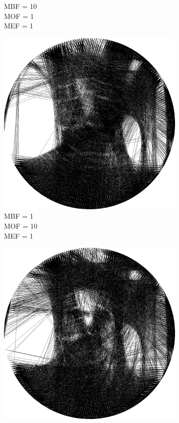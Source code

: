 \begin{figure}[htb]
\begin{subfigure}{0.24\textwidth}
        \caption{MBF = 10 \\ MOF = 1 \\ MEF = 1}
        \label{mine-param-taco-thread-d}
    \end{subfigure}
    \begin{subfigure}{0.24\textwidth}
        \centering
        \includegraphics[width = \textwidth]{img/4-mine/taco-thread/taco_e_i3000_c20_inv0_bg1_obj10_ed1.png}
        \caption{MBF = 1 \\ MOF = 10 \\ MEF = 1}
        \label{mine-param-taco-thread-e}
    \end{subfigure}
    \begin{subfigure}{0.24\textwidth}
        \centering
        \includegraphics[width = \textwidth]{img/4-mine/taco-thread/taco_e_i3000_c20_inv0_bg1_obj1_ed10.png}

\end{subfigure}
\end{figure}
